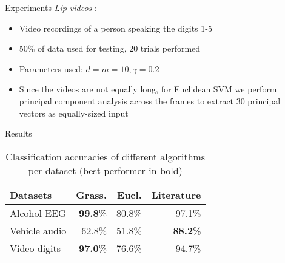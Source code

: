 \documentclass[final]{beamer}
\newlength{\sepwid}
\newlength{\onecolwid}
\begin{document}
\begin{frame}[t]
\begin{columns}[t]
\begin{column}{\onecolwid}
\begin{block}{Experiments}
    \textit{Lip videos} \cite{lieu_signal_2011}:
    \begin{itemize}
        \item Video recordings of a person speaking the digits 1-5
        \item 50\% of data used for testing, 20 trials performed
        \item Parameters used: $d = m = 10, \gamma = 0.2$
        \item Since the videos are not equally long, for Euclidean SVM we perform principal
            component analysis across the frames to extract 30 principal vectors as equally-sized
            input
    \end{itemize}
\end{block}


\begin{block}{Results}
    \begin{table}
        \begin{tabular}{l r r r}
            \toprule
            \textbf{Datasets} & Grass. & Eucl.  & Literature \\
            \midrule
            Alcohol EEG       & \textbf{99.8}\% & 80.8\% & 97.1\% \cite{sharma_novel_2017} \\
            Vehicle audio     & 62.8\% & 51.8\% & \textbf{88.2}\% \cite{sunu_dimensionality_2018} \\
            Video digits      & \textbf{97.0}\% & 76.6\% & 94.7\% \cite{lieu_signal_2011} \\
            \bottomrule
        \end{tabular}
        \caption{Classification accuracies of different algorithms per dataset (best performer in
        bold)}
        \label{results}
    \end{table}
\end{block}


\end{column} %

\begin{column}{\sepwid}\end{column} %

\begin{column}{\onecolwid} %


\end{column}
\end{columns}
\end{frame}
\end{document}
